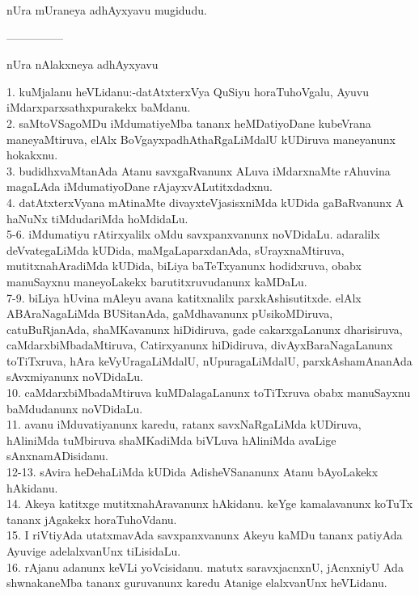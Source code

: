 \documentclass{article}
\begin{document}
\begin{center}
nUra mUraneya adhAyxyavu mugidudu.
\end{center}

\begin{center}
---------------
\end{center}

\begin{center}
nUra nAlakxneya adhAyxyavu
\end{center}

1. kuMjalanu heVLidanu:-datAtxterxVya QuSiyu horaTuhoVgalu, Ayuvu iMdarxparxsathxpurakekx baMdanu.\\
2. saMtoVSagoMDu iMdumatiyeMba tananx heMDatiyoDane kubeVrana maneyaMtiruva, elAlx BoVgayxpadhAthaRgaLiMdalU kUDiruva maneyanunx hokakxnu.\\
3. budidhxvaMtanAda Atanu savxgaRvanunx ALuva iMdarxnaMte rAhuvina magaLAda iMdumatiyoDane rAjayxvALutitxdadxnu.\\
4. datAtxterxVyana mAtinaMte divayxteVjasisxniMda kUDida gaBaRvanunx A haNuNx tiMdudariMda hoMdidaLu.\\
5-6. iMdumatiyu rAtirxyalilx oMdu savxpanxvanunx noVDidaLu. adaralilx deVvategaLiMda kUDida, maMgaLaparxdanAda, sUrayxnaMtiruva, mutitxnahAradiMda kUDida, biLiya baTeTxyanunx hodidxruva, obabx manuSayxnu maneyoLakekx barutitxruvudanunx kaMDaLu.\\
7-9. biLiya hUvina mAleyu avana katitxnalilx parxkAshisutitxde. elAlx ABAraNagaLiMda BUSitanAda, gaMdhavanunx pUsikoMDiruva, catuBuRjanAda, shaMKavanunx hiDidiruva, gade cakarxgaLanunx dharisiruva, caMdarxbiMbadaMtiruva, Catirxyanunx hiDidiruva, divAyxBaraNagaLanunx toTiTxruva, hAra keVyUragaLiMdalU, nUpuragaLiMdalU, parxkAshamAnanAda sAvxmiyanunx noVDidaLu.\\
10. caMdarxbiMbadaMtiruva kuMDalagaLanunx toTiTxruva obabx manuSayxnu baMdudanunx noVDidaLu.\\
11. avanu iMduvatiyanunx karedu, ratanx savxNaRgaLiMda kUDiruva, hAliniMda tuMbiruva shaMKadiMda biVLuva hAliniMda avaLige sAnxnamADisidanu.\\
12-13. sAvira heDehaLiMda kUDida AdisheVSananunx Atanu bAyoLakekx hAkidanu.\\
14. Akeya katitxge mutitxnahAravanunx hAkidanu. keYge kamalavanunx koTuTx tananx jAgakekx horaTuhoVdanu.\\
15. I riVtiyAda utatxmavAda savxpanxvanunx Akeyu kaMDu tananx patiyAda Ayuvige adelalxvanUnx tiLisidaLu.\\
16. rAjanu adanunx keVLi yoVcisidanu. matutx saravxjacnxnU, jAcnxniyU Ada shwnakaneMba tananx guruvanunx karedu Atanige elalxvanUnx heVLidanu.\\
\end{document}

